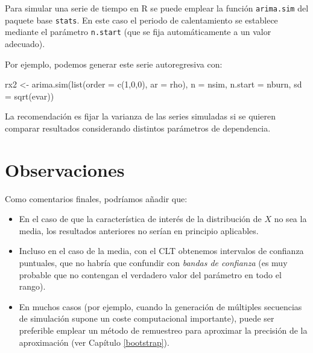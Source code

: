 \documentclass[
  10pt,
]{book}
\newenvironment{Shaded}{\begin{snugshade}}{\end{snugshade}}
\newcommand{\AttributeTok}[1]{\textcolor[rgb]{0.77,0.63,0.00}{#1}}
\newcommand{\DecValTok}[1]{\textcolor[rgb]{0.00,0.00,0.81}{#1}}
\newcommand{\FunctionTok}[1]{\textcolor[rgb]{0.00,0.00,0.00}{#1}}
\newcommand{\NormalTok}[1]{#1}
\newcommand{\OtherTok}[1]{\textcolor[rgb]{0.56,0.35,0.01}{#1}}
\theoremstyle{break}
\theoremstyle{nonumberplain}
\begin{document}
Para simular una serie de tiempo en R se puede emplear la función \texttt{arima.sim} del paquete base \texttt{stats}.
En este caso el periodo de calentamiento se establece mediante el parámetro \texttt{n.start} (que se fija automáticamente a un valor adecuado).

Por ejemplo, podemos generar este serie autoregresiva con:

\begin{Shaded}
\begin{Highlighting}[]
\NormalTok{rx2 }\OtherTok{\textless{}{-}} \FunctionTok{arima.sim}\NormalTok{(}\FunctionTok{list}\NormalTok{(}\AttributeTok{order =} \FunctionTok{c}\NormalTok{(}\DecValTok{1}\NormalTok{,}\DecValTok{0}\NormalTok{,}\DecValTok{0}\NormalTok{), }\AttributeTok{ar =}\NormalTok{ rho), }\AttributeTok{n =}\NormalTok{ nsim, }
                 \AttributeTok{n.start =}\NormalTok{ nburn, }\AttributeTok{sd =} \FunctionTok{sqrt}\NormalTok{(evar))}
\end{Highlighting}
\end{Shaded}

La recomendación es fijar la varianza de las series simuladas si se quieren comparar
resultados considerando distintos parámetros de dependencia.

\hypertarget{observaciones}{%
\section{Observaciones}\label{observaciones}}

Como comentarios finales, podríamos añadir que:

\begin{itemize}
\item
  En el caso de que la característica de interés de la distribución de \(X\) no sea la media, los resultados anteriores no serían en principio aplicables.
\item
  Incluso en el caso de la media, con el CLT obtenemos intervalos de confianza puntuales, que no habría que confundir con \emph{bandas de confianza} (es muy probable que no contengan el verdadero valor del parámetro en todo el rango).
\item
  En muchos casos (por ejemplo, cuando la generación de múltiples secuencias de simulación supone un coste computacional importante), puede ser preferible emplear un método de remuestreo para aproximar la precisión de la aproximación (ver Capítulo \ref{bootstrap}).
\end{itemize}
\end{document}
